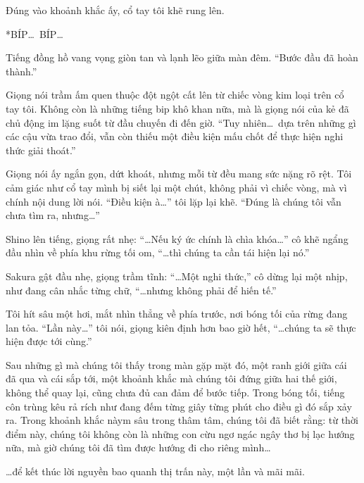 \documentclass[../main.tex]{subfiles}
\begin{document}
Đúng vào khoảnh khắc ấy, cổ tay tôi khẽ rung lên.

*BÍP\dots\ BÍP\dots*

Tiếng đồng hồ vang vọng giòn tan và lạnh lẽo giữa màn đêm. ``Bước đầu đã hoàn thành.''

Giọng nói trầm ấm quen thuộc đột ngột cất lên từ chiếc vòng kim loại trên cổ tay tôi. Không còn là những tiếng bip khô khan nữa, mà là giọng nói của kẻ đã chủ động im lặng suốt từ đầu chuyến đi đến giờ. ``Tuy nhiên\dots\ dựa trên những gì các cậu vừa trao đổi, vẫn còn thiếu một điều kiện mấu chốt để thực hiện nghi thức giải thoát.''

Giọng nói ấy ngắn gọn, dứt khoát, nhưng mỗi từ đều mang sức nặng rõ rệt. Tôi cảm giác như cổ tay mình bị siết lại một chút, không phải vì chiếc vòng, mà vì chính nội dung lời nói.
``Điều kiện à\dots'' tôi lặp lại khẽ. ``Đúng là chúng tôi vẫn chưa tìm ra, nhưng\dots''

Shino lên tiếng, giọng rất nhẹ: ``\dots Nếu ký ức chính là chìa khóa\dots'' cô khẽ ngẩng đầu nhìn về phía khu rừng tối om, ``\dots thì chúng ta cần tái hiện lại nó.''

Sakura gật đầu nhẹ, giọng trầm tĩnh: ``\dots Một nghi thức,'' cô dừng lại một nhịp, như đang cân nhắc từng chữ, ``\dots nhưng không phải để hiến tế.''

Tôi hít sâu một hơi, mắt nhìn thẳng về phía trước, nơi bóng tối của rừng đang lan tỏa. ``Lần này\dots'' tôi nói, giọng kiên định hơn bao giờ hết, ``\dots chúng ta sẽ thực hiện được tới cùng.''

Sau những gì mà chúng tôi thấy trong màn gặp mặt đó, một ranh giới giữa cái đã qua và cái sắp tới, một khoảnh khắc mà chúng tôi đứng giữa hai thế giới, không thể quay lại, cũng chưa đủ can đảm để bước tiếp. Trong bóng tối, tiếng côn trùng kêu rả rích như đang đếm từng giây từng phút cho điều gì đó sắp xảy ra. Trong khoảnh khắc nàym sâu trong thâm tâm, chúng tôi đã biết rằng: từ thời điểm này, chúng tôi không còn là những con cừu ngơ ngác ngây thơ bị lạc hướng nữa, mà giờ chúng tôi đã tìm được hướng đi cho riêng mình\dots

\dots để kết thúc lời nguyền bao quanh thị trấn này, một lần và mãi mãi.
\end{document}

